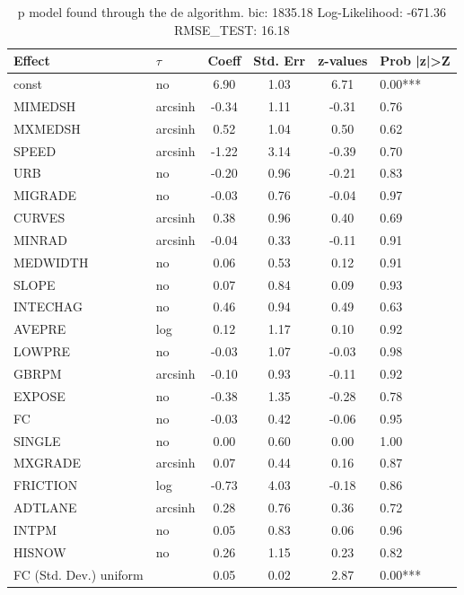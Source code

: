 \begin{table}
	\caption{p model found through the de algorithm. bic: 1835.18 Log-Likelihood: -671.36 RMSE_TEST: 16.18}
	\begin{center}
		\begin{tabular}{|l|l|c|c|c|l|}
			\hline
			Effect & $\tau$ & Coeff & Std. Err & z-values & Prob |z|>Z \\
			\hline
			const & no & 6.90 & 1.03 & 6.71 & 0.00*** \\
			\hline
			MIMEDSH & arcsinh & -0.34 & 1.11 & -0.31 & 0.76 \\
			\hline
			MXMEDSH & arcsinh & 0.52 & 1.04 & 0.50 & 0.62 \\
			\hline
			SPEED & arcsinh & -1.22 & 3.14 & -0.39 & 0.70 \\
			\hline
			URB & no & -0.20 & 0.96 & -0.21 & 0.83 \\
			\hline
			MIGRADE & no & -0.03 & 0.76 & -0.04 & 0.97 \\
			\hline
			CURVES & arcsinh & 0.38 & 0.96 & 0.40 & 0.69 \\
			\hline
			MINRAD & arcsinh & -0.04 & 0.33 & -0.11 & 0.91 \\
			\hline
			MEDWIDTH & no & 0.06 & 0.53 & 0.12 & 0.91 \\
			\hline
			SLOPE & no & 0.07 & 0.84 & 0.09 & 0.93 \\
			\hline
			INTECHAG & no & 0.46 & 0.94 & 0.49 & 0.63 \\
			\hline
			AVEPRE & log & 0.12 & 1.17 & 0.10 & 0.92 \\
			\hline
			LOWPRE & no & -0.03 & 1.07 & -0.03 & 0.98 \\
			\hline
			GBRPM & arcsinh & -0.10 & 0.93 & -0.11 & 0.92 \\
			\hline
			EXPOSE & no & -0.38 & 1.35 & -0.28 & 0.78 \\
			\hline
			FC & no & -0.03 & 0.42 & -0.06 & 0.95 \\
			\hline
			SINGLE & no & 0.00 & 0.60 & 0.00 & 1.00 \\
			\hline
			MXGRADE & arcsinh & 0.07 & 0.44 & 0.16 & 0.87 \\
			\hline
			FRICTION & log & -0.73 & 4.03 & -0.18 & 0.86 \\
			\hline
			ADTLANE & arcsinh & 0.28 & 0.76 & 0.36 & 0.72 \\
			\hline
			INTPM & no & 0.05 & 0.83 & 0.06 & 0.96 \\
			\hline
			HISNOW & no & 0.26 & 1.15 & 0.23 & 0.82 \\
			\hline
			FC (Std. Dev.) uniform &  & 0.05 & 0.02 & 2.87 & 0.00*** \\

\end{tabular}
\end{center}
\end{table}
